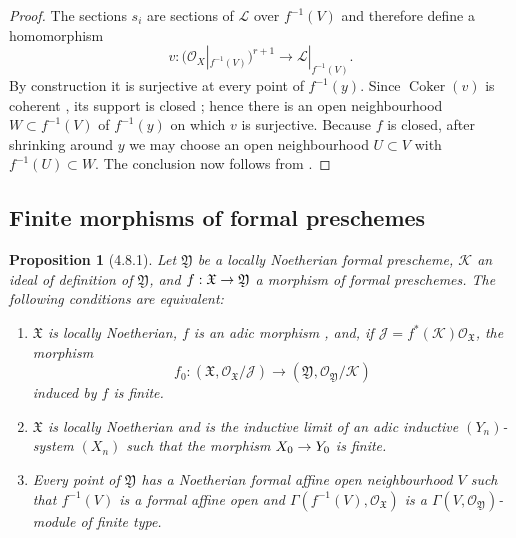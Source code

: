 \documentclass[oneside]{amsart}
\theoremstyle{ega-env-style}
\theoremstyle{ega-thm-env-style}
\newtheorem*{proposition}{Proposition}
\theoremstyle{ega-defn-env-style}
\def\mathcal{\mathscr}
\def\sh{\mathcal}                   %
\def\Coker{\operatorname{Coker}}
\renewcommand{\to}{\mathchoice{\longrightarrow}{\rightarrow}{\rightarrow}{\rightarrow}}
\let\EGAOriginalLabel\label
\renewcommand{\label}[1]{\phantomsection\EGAOriginalLabel{#1}}
\begin{document}
\begin{proof}
The sections $s_i$ are sections of $\sh{L}$ over $f^{-1}(V)$ and
therefore define a homomorphism
\[
  v:
  \bigl(\sh{O}_X|_{f^{-1}(V)}\bigr)^{r+1}
  \longrightarrow
  \sh{L}|_{f^{-1}(V)}.
\]
By construction it is surjective at every point of $f^{-1}(y)$.
Since $\Coker(v)$ is coherent , its support is
closed ; hence there is an open neighbourhood
$W\subset f^{-1}(V)$ of $f^{-1}(y)$ on which $v$ is surjective.
Because $f$ is closed, after shrinking around $y$ we may choose an
open neighbourhood $U\subset V$ with $f^{-1}(U)\subset W$.
The conclusion now follows from .
\end{proof}


\subsection{Finite morphisms of formal preschemes}
\label{subsection:III.4.8}

\begin{proposition}[4.8.1]
\label{III.4.8.1}
Let $\mathfrak{Y}$ be a locally Noetherian formal prescheme,
$\sh{K}$ an ideal of definition of $\mathfrak{Y}$, and
$f:\mathfrak{X}\to\mathfrak{Y}$ a morphism of formal preschemes.
The following conditions are equivalent:
\begin{enumerate}
  \item[\rm{a)}] $\mathfrak{X}$ is locally Noetherian, $f$ is an
    adic morphism , and, if
    $\sh{J}=f^*(\sh{K})\sh{O}_{\mathfrak{X}}$, the morphism
    \[
      f_0:
      (\mathfrak{X},\sh{O}_{\mathfrak{X}}/\sh{J})
      \longrightarrow
      (\mathfrak{Y},\sh{O}_{\mathfrak{Y}}/\sh{K})
    \]
    induced by $f$ is finite.
  \item[\rm{b)}] $\mathfrak{X}$ is locally Noetherian and is the
    inductive limit of an adic inductive $(Y_n)$-system $(X_n)$
    such that the morphism $X_0\to Y_0$ is finite.
  \item[\rm{c)}] Every point of $\mathfrak{Y}$ has a Noetherian
    formal affine open neighbourhood $V$ such that $f^{-1}(V)$ is
    a formal affine open and
    $\Gamma(f^{-1}(V),\sh{O}_{\mathfrak{X}})$ is a
    $\Gamma(V,\sh{O}_{\mathfrak{Y}})$-module of finite type.
\end{enumerate}
\end{proposition}
\end{document}
